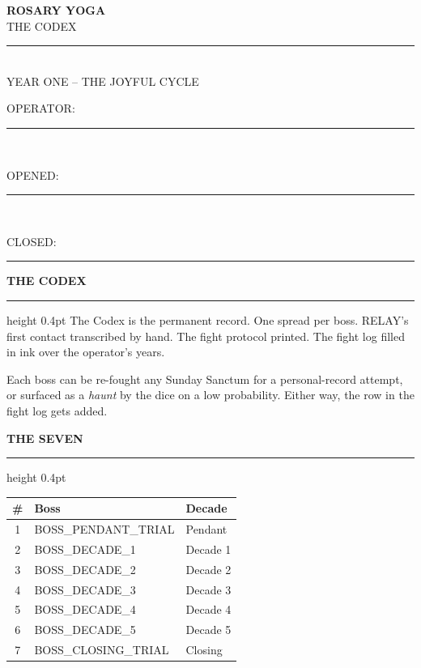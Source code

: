 \documentclass[10pt]{article}
\begin{document}
\thispagestyle{empty}
\vspace*{1.0in}
\begin{center}
  {\Huge\bfseries\sffamily ROSARY YOGA}\\[6pt]
  {\Large\sffamily THE CODEX}\\[1.2in]
  \rule{2in}{0.5pt}\\[6pt]
  {\sffamily\small YEAR ONE -- THE JOYFUL CYCLE}\\[1.4in]
  {\sffamily\small OPERATOR:~\rule[-2pt]{1.8in}{0.4pt}}\\[10pt]
  {\sffamily\small OPENED:~\rule[-2pt]{1.8in}{0.4pt}}\\[10pt]
  {\sffamily\small CLOSED:~\rule[-2pt]{1.8in}{0.4pt}}
\end{center}
\newpage

{\sffamily\bfseries\small THE CODEX}\par
\vspace{4pt}\hrule height 0.4pt\vspace{6pt}
\footnotesize
The Codex is the permanent record. One spread per boss. RELAY's first contact
transcribed by hand. The fight protocol printed. The fight log filled in
ink over the operator's years.

Each boss can be re-fought any Sunday Sanctum for a personal-record attempt,
or surfaced as a \emph{haunt} by the dice on a low probability. Either way,
the row in the fight log gets added.

\vspace{12pt}
{\sffamily\bfseries\small THE SEVEN}\par
\vspace{4pt}\hrule height 0.4pt\vspace{6pt}
\begin{tabularx}{\linewidth}{@{}c X l@{}}
\toprule
\textbf{\#} & \textbf{Boss} & \textbf{Decade} \\
\midrule
1 & BOSS\_PENDANT\_TRIAL          & Pendant   \\
2 & BOSS\_DECADE\_1               & Decade 1  \\
3 & BOSS\_DECADE\_2               & Decade 2  \\
4 & BOSS\_DECADE\_3               & Decade 3  \\
5 & BOSS\_DECADE\_4               & Decade 4  \\
6 & BOSS\_DECADE\_5               & Decade 5  \\
7 & BOSS\_CLOSING\_TRIAL          & Closing   \\
\bottomrule
\end{tabularx}
\end{document}
